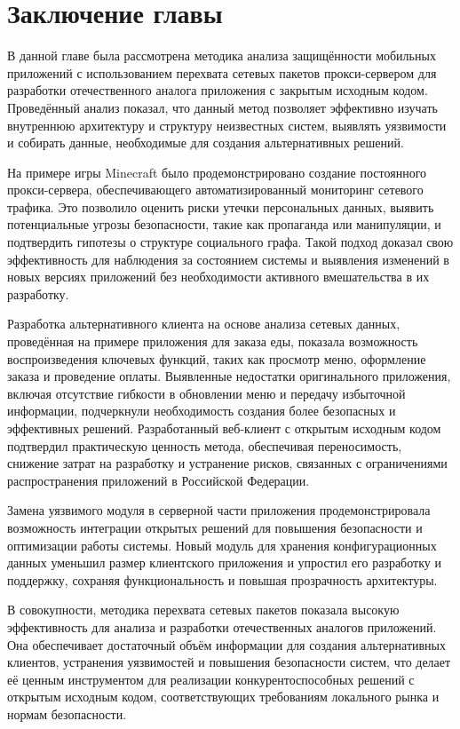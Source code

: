 \section{Заключение главы}

В данной главе была рассмотрена методика анализа защищённости мобильных приложений с использованием перехвата сетевых пакетов прокси-сервером для разработки отечественного аналога приложения с закрытым исходным кодом. Проведённый анализ показал, что данный метод позволяет эффективно изучать внутреннюю архитектуру и структуру неизвестных систем, выявлять уязвимости и собирать данные, необходимые для создания альтернативных решений.

На примере игры Minecraft было продемонстрировано создание постоянного прокси-сервера, обеспечивающего автоматизированный мониторинг сетевого трафика. Это позволило оценить риски утечки персональных данных, выявить потенциальные угрозы безопасности, такие как пропаганда или манипуляции, и подтвердить гипотезы о структуре социального графа. Такой подход доказал свою эффективность для наблюдения за состоянием системы и выявления изменений в новых версиях приложений без необходимости активного вмешательства в их разработку.

Разработка альтернативного клиента на основе анализа сетевых данных, проведённая на примере приложения для заказа еды, показала возможность воспроизведения ключевых функций, таких как просмотр меню, оформление заказа и проведение оплаты. Выявленные недостатки оригинального приложения, включая отсутствие гибкости в обновлении меню и передачу избыточной информации, подчеркнули необходимость создания более безопасных и эффективных решений. Разработанный веб-клиент с открытым исходным кодом подтвердил практическую ценность метода, обеспечивая переносимость, снижение затрат на разработку и устранение рисков, связанных с ограничениями распространения приложений в Российской Федерации.

Замена уязвимого модуля в серверной части приложения продемонстрировала возможность интеграции открытых решений для повышения безопасности и оптимизации работы системы. Новый модуль для хранения конфигурационных данных уменьшил размер клиентского приложения и упростил его разработку и поддержку, сохраняя функциональность и повышая прозрачность архитектуры.

В совокупности, методика перехвата сетевых пакетов показала высокую эффективность для анализа и разработки отечественных аналогов приложений. Она обеспечивает достаточный объём информации для создания альтернативных клиентов, устранения уязвимостей и повышения безопасности систем, что делает её ценным инструментом для реализации конкурентоспособных решений с открытым исходным кодом, соответствующих требованиям локального рынка и нормам безопасности.
